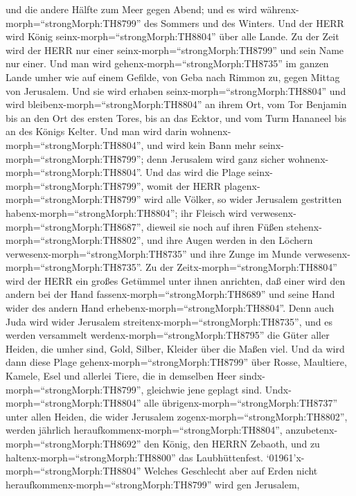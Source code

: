 und die andere Hälfte zum Meer gegen Abend; und es wird
währenx-morph=``strongMorph:TH8799'' des Sommers und des Winters.
 Und der HERR wird König seinx-morph=``strongMorph:TH8804''
über alle Lande. Zu der Zeit wird der HERR nur einer
seinx-morph=``strongMorph:TH8799'' und sein Name nur einer.
 Und man wird gehenx-morph=``strongMorph:TH8735'' im ganzen
Lande umher wie auf einem Gefilde, von Geba nach Rimmon zu, gegen Mittag
von Jerusalem. Und sie wird erhaben seinx-morph=``strongMorph:TH8804''
und wird bleibenx-morph=``strongMorph:TH8804'' an ihrem Ort, vom Tor
Benjamin bis an den Ort des ersten Tores, bis an das Ecktor, und vom
Turm Hananeel bis an des Königs Kelter.  Und man wird darin
wohnenx-morph=``strongMorph:TH8804'', und wird kein Bann mehr
seinx-morph=``strongMorph:TH8799''; denn Jerusalem wird ganz sicher
wohnenx-morph=``strongMorph:TH8804''.  Und das wird die
Plage seinx-morph=``strongMorph:TH8799'', womit der HERR
plagenx-morph=``strongMorph:TH8799'' wird alle Völker, so wider
Jerusalem gestritten habenx-morph=``strongMorph:TH8804''; ihr Fleisch
wird verwesenx-morph=``strongMorph:TH8687'', dieweil sie noch auf ihren
Füßen stehenx-morph=``strongMorph:TH8802'', und ihre Augen werden in den
Löchern verwesenx-morph=``strongMorph:TH8735'' und ihre Zunge im Munde
verwesenx-morph=``strongMorph:TH8735''.  Zu der
Zeitx-morph=``strongMorph:TH8804'' wird der HERR ein großes Getümmel
unter ihnen anrichten, daß einer wird den andern bei der Hand
fassenx-morph=``strongMorph:TH8689'' und seine Hand wider des andern
Hand erhebenx-morph=``strongMorph:TH8804''.  Denn auch Juda
wird wider Jerusalem streitenx-morph=``strongMorph:TH8735'', und es
werden versammelt werdenx-morph=``strongMorph:TH8795'' die Güter aller
Heiden, die umher sind, Gold, Silber, Kleider über die Maßen viel.
 Und da wird dann diese Plage
gehenx-morph=``strongMorph:TH8799'' über Rosse, Maultiere, Kamele, Esel
und allerlei Tiere, die in demselben Heer
sindx-morph=``strongMorph:TH8799'', gleichwie jene geplagt sind.
 Undx-morph=``strongMorph:TH8804'' alle
übrigenx-morph=``strongMorph:TH8737'' unter allen Heiden, die wider
Jerusalem zogenx-morph=``strongMorph:TH8802'', werden jährlich
heraufkommenx-morph=``strongMorph:TH8804'',
anzubetenx-morph=``strongMorph:TH8692'' den König, den HERRN Zebaoth,
und zu haltenx-morph=``strongMorph:TH8800'' das Laubhüttenfest.
 `01961'\textbar x-morph=``strongMorph:TH8804'' Welches
Geschlecht aber auf Erden nicht
heraufkommenx-morph=``strongMorph:TH8799'' wird gen Jerusalem,
